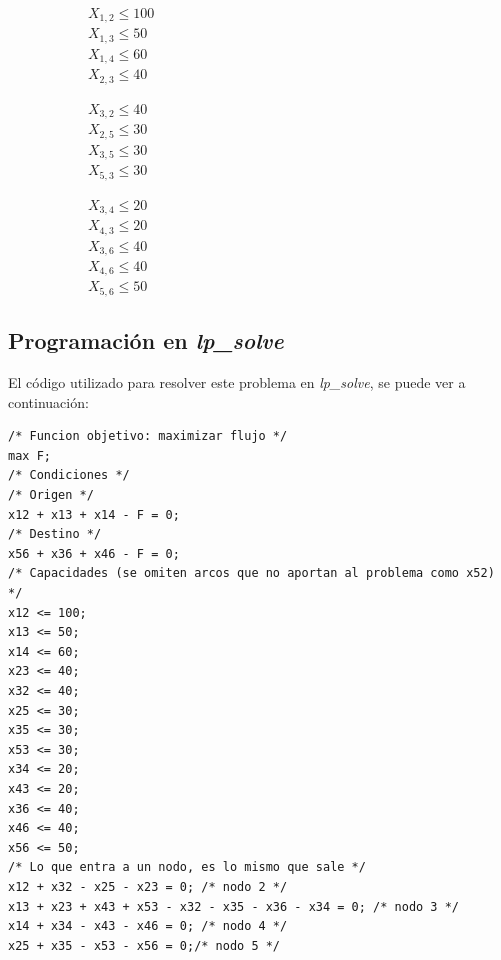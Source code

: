 \documentclass[12pt,letterpaper]{article}
\begin{document}
\begin{figure}[htbp]
        \begin{subfigure}[htbp]{4cm}
                \centering
                $X_{1,2} \leq 100$\\
                $X_{1,3} \leq 50$\\
                $X_{1,4} \leq 60$\\
                $X_{2,3} \leq 40$
        \end{subfigure}
        \begin{subfigure}[htbp]{4cm}
                \centering
                $X_{3,2} \leq 40$\\
                $X_{2,5} \leq 30$\\
                $X_{3,5} \leq 30$\\
                $X_{5,3} \leq 30$
        \end{subfigure}
        \begin{subfigure}[htbp]{4cm}
                \centering
                $X_{3,4} \leq 20$\\
                $X_{4,3} \leq 20$\\
                $X_{3,6} \leq 40$\\
                $X_{4,6} \leq 40$\\
                $X_{5,6} \leq 50$
        \end{subfigure}
\end{figure}

\subsection{Programación en \textit{lp\_solve}}
El código utilizado para resolver este problema en \textit{lp\_solve}, se puede ver a continuación:

\begin{verbatim}
/* Funcion objetivo: maximizar flujo */
max F;
/* Condiciones */
/* Origen */
x12 + x13 + x14 - F = 0;
/* Destino */
x56 + x36 + x46 - F = 0;
/* Capacidades (se omiten arcos que no aportan al problema como x52) */
x12 <= 100;
x13 <= 50;
x14 <= 60;
x23 <= 40;
x32 <= 40;
x25 <= 30;
x35 <= 30;
x53 <= 30;
x34 <= 20;
x43 <= 20;
x36 <= 40;
x46 <= 40;
x56 <= 50;
/* Lo que entra a un nodo, es lo mismo que sale */
x12 + x32 - x25 - x23 = 0; /* nodo 2 */
x13 + x23 + x43 + x53 - x32 - x35 - x36 - x34 = 0; /* nodo 3 */
x14 + x34 - x43 - x46 = 0; /* nodo 4 */
x25 + x35 - x53 - x56 = 0;/* nodo 5 */
\end{verbatim}
\end{document}
